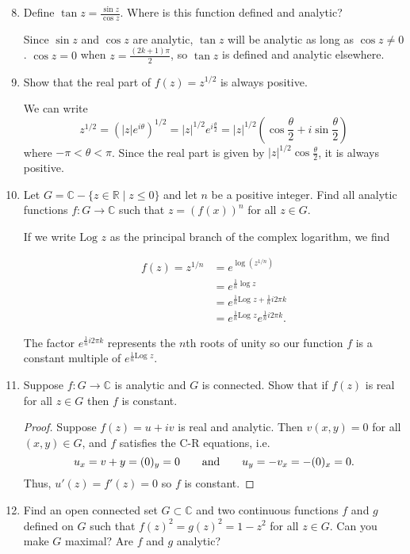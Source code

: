 \documentclass[11pt,oneside,english]{amsart}
\theoremstyle{definition}
\newcommand{\aspace}{\hspace{7mm}\text{and}\hspace{7mm}}
\newcommand{\Log}{\text{Log }}
\newcommand{\MB}[1]{\mathbb{#1}}
\begin{document}
\begin{enumerate}[leftmargin=*]
\setcounter{enumi}{7}
\item Define $\tan z=\frac{\sin z}{\cos z}$. Where is this function defined and analytic?

Since $\sin z$ and $\cos z$ are analytic, $\tan z$ will be analytic as long as $\cos z\neq 0$. $\cos z=0$ when $z=\frac{(2k+1)\pi}{2}$, so $\tan z$ is defined and analytic elsewhere.




\setcounter{enumi}{11}
\item Show that the real part of $f(z)=z^{1/2}$ is always positive.

We can write
\[
z^{1/2}=\left(|z|e^{i\theta}\right)^{1/2}=|z|^{1/2}e^{i\frac{\theta}{2}}=|z|^{1/2}\left(\cos\frac{\theta}{2}+i\sin\frac{\theta}{2}\right)
\]
where $-\pi<\theta<\pi$. Since the real part is given by $|z|^{1/2}\cos\frac{\theta}{2}$, it is always positive.


\item Let $G=\MB{C}-\{z\in\MB{R}\mid z\leq 0\}$ and let $n$ be a positive integer. Find all analytic functions $f:G\to \MB{C}$ such that $z=\left(f(x)\right)^n$ for all $z\in G$.

If we write $\Log z$ as the principal branch of the complex logarithm, we find

\begin{align*}
f(z)=z^{1/n}&=e^{\log(z^{1/n})}\\[2mm]
&=e^{\frac{1}{n}\log z}\\[2mm]
&=e^{\frac{1}{n}\Log z+ \frac{1}{n}i2\pi k}\\[2mm]
&=e^{\frac{1}{n}\Log z}e^{\frac{1}{n}i2\pi k}.
\end{align*}

The factor $e^{\frac{1}{n}i2\pi k}$ represents the $n$th roots of unity so our function $f$ is a constant multiple of $e^{\frac{1}{n}\Log z}$.

\item Suppose $f:G\to \MB{C}$ is analytic and $G$ is connected. Show that if $f(z)$ is real for all $z\in G$ then $f$ is constant.

\begin{proof}
Suppose $f(z)=u+iv$ is real and analytic. Then $v(x,y)=0$ for all $(x,y)\in G$, and $f$ satisfies the C-R equations, i.e.
\[
u_x=v+y=(0)_y=0 \aspace u_y=-v_x=-(0)_x=0.
\]
Thus, $u'(z)=f'(z)=0$ so $f$ is constant.
\end{proof}

\setcounter{enumi}{15}

\item Find an open connected set $G\subset \MB{C}$ and two continuous functions $f$ and $g$ defined on $G$ such that $f(z)^2=g(z)^2=1-z^2$ for all $z\in G$. Can you make $G$ maximal? Are $f$ and $g$ analytic?


\end{enumerate}
\end{document}
